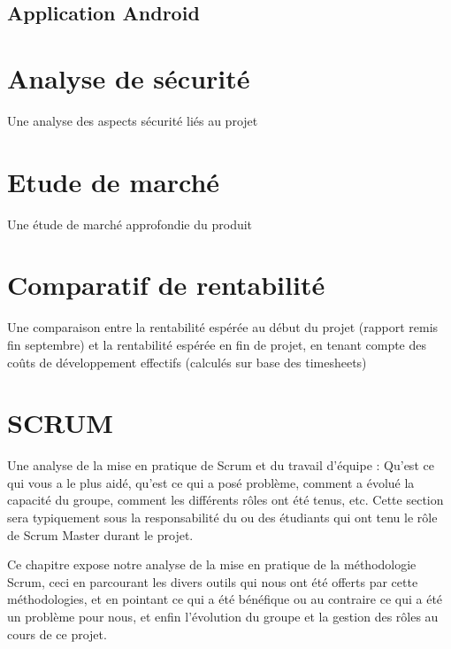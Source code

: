 \documentclass{report}
\begin{document}
		

	\section{Application Android}



\chapter{Analyse de sécurité} %


	Une analyse des aspects sécurité liés au projet


\chapter{Etude de marché} %


	Une étude de marché approfondie du produit

\chapter{Comparatif de rentabilité} %


	Une comparaison entre la rentabilité espérée au début du projet (rapport remis fin septembre) et la rentabilité espérée en fin de projet, en tenant compte des coûts de développement effectifs (calculés sur base des timesheets)

\chapter{SCRUM} %

	Une analyse de la mise en pratique de Scrum et du travail d’équipe : Qu’est ce qui vous a le plus aidé, qu’est ce qui a posé problème, comment a évolué la capacité du groupe, comment les différents rôles ont été tenus, etc.  Cette section sera typiquement sous la responsabilité du ou des étudiants qui ont tenu le rôle de Scrum Master durant le projet.

	Ce chapitre expose notre analyse de la mise en pratique de la méthodologie Scrum, ceci en parcourant les divers outils qui nous ont été offerts par cette méthodologies, et en pointant ce qui a été bénéfique ou au contraire ce qui a été un problème pour nous, et enfin l'évolution du groupe et la gestion des rôles au cours de ce projet.\\
\end{document}
